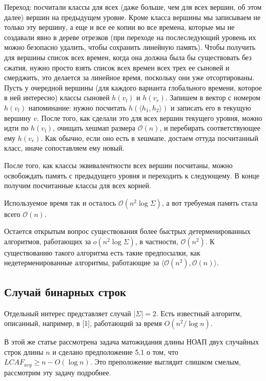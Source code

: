 Переход: посчитали классы для всех (даже больше, чем для всех вершин, об этом далее) вершин на предыдущем уровне. Кроме класса вершины мы записываем не только эту вершину, а еще и все ее копии во все времена, которые мы не создавали явно в дереве отрезков (при переходе на послеследующий уровень их можно безопасно удалить, чтобы сохранить линейную память). Чтобы получить для вершины список всех времен, когда она должна была бы существовать без сжатия, нужно просто взять список всех времен всех трех ее сыновей и смерджить, это делается за линейное время, поскольку они уже отсортированы. Пусть у очередной вершины (для каждого варианта глобального времени, которое в ней интересно) классы сыновей $h(v_l)$ и $h(v_r)$. Запишем в вектор с номером $h(v_l)$ напоминание: нужно посчитать $h(\langle h_1, h_2 \rangle)$ и записать его в текущую вершину $v$. После того, как сделали это для всех вершин текущего уровня, можно идти по $h(v_l)$, очищать хешмап размера $\mathcal{O}(n)$, и перебирать соответствующее ему $h(v_r)$. Как обычно, если оно есть в хешмапе, достаем оттуда посчитанный класс, иначе сопоставляем ему новый. 

После того, как классы эквивалентности всех вершин посчитаны, можно освобождать память с предыдущего уровня и переходить к следующему. В конце получим посчитанные классы для всех корней.

Используемое время так и осталось $\mathcal{O}(n^2 \log \Sigma)$, а вот требуемая память стала всего $\mathcal{O}(n)$.

Остается открытым вопрос существования более быстрых детерменированных алгоритмов, работающих за $o(n^2 \log \Sigma)$, в частности, $\mathcal{O}(n^2)$. К существованию такого алгоритма есть такие предпосылки, как недетерменированные алгоритмы, работающие за $\langle \mathcal{O}(n^2), \mathcal{O}(n) \rangle$.

\subsection{Случай бинарных строк}
Отдельный интерес представляет случай $|\Sigma|=2$. Есть известный алгоритм, описанный, например, в [1], работающий за время $O(n^2/\log n)$.

В этой же статье рассмотрена задача матожидания длины НОАП двух случайных строк длины $n$ и сделано предположение 5.1 о том, что $LCAF_{avg} \ge n - O(\log n)$. Это преположение выглядит слишком смелым, рассмотрим эту задачу подробнее.


